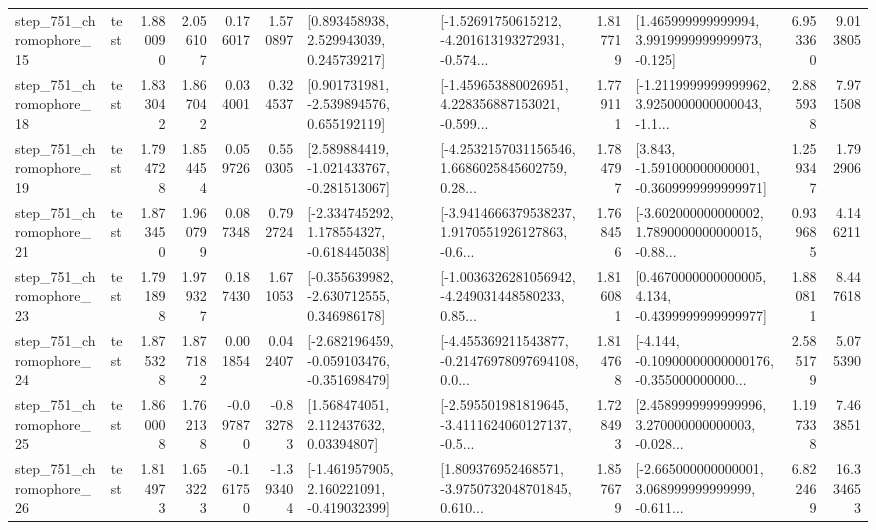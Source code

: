 \begin{tabular}{llrrrrllrlrr}
  step\_751\_chromophore\_15 &      test &      1.880090 &    2.056107 &      0.176017 &  1.570897 &     [0.893458938, 2.529943039, 0.245739217] &  [-1.52691750615212, -4.201613193272931, -0.574... &       1.817719 &    [1.465999999999994, 3.9919999999999973, -0.125] &            6.953360 &          9.013805 \\
  step\_751\_chromophore\_18 &      test &      1.833042 &    1.867042 &      0.034001 &  0.324537 &    [0.901731981, -2.539894576, 0.655192119] &  [-1.459653880026951, 4.228356887153021, -0.599... &       1.779111 &  [-1.2119999999999962, 3.9250000000000043, -1.1... &            2.885938 &          7.971508 \\
  step\_751\_chromophore\_19 &      test &      1.794728 &    1.854454 &      0.059726 &  0.550305 &   [2.589884419, -1.021433767, -0.281513067] &  [-4.2532157031156546, 1.6686025845602759, 0.28... &       1.784797 &   [3.843, -1.591000000000001, -0.3609999999999971] &            1.259347 &          1.792906 \\
  step\_751\_chromophore\_21 &      test &      1.873450 &    1.960799 &      0.087348 &  0.792724 &   [-2.334745292, 1.178554327, -0.618445038] &  [-3.9414666379538237, 1.9170551926127863, -0.6... &       1.768456 &  [-3.602000000000002, 1.7890000000000015, -0.88... &            0.939685 &          4.146211 \\
  step\_751\_chromophore\_23 &      test &      1.791898 &    1.979327 &      0.187430 &  1.671053 &   [-0.355639982, -2.630712555, 0.346986178] &  [-1.0036326281056942, -4.249031448580233, 0.85... &       1.816081 &   [0.4670000000000005, 4.134, -0.4399999999999977] &            1.880811 &          8.447618 \\
  step\_751\_chromophore\_24 &      test &      1.875328 &    1.877182 &      0.001854 &  0.042407 &  [-2.682196459, -0.059103476, -0.351698479] &  [-4.455369211543877, -0.21476978097694108, 0.0... &       1.814768 &  [-4.144, -0.10900000000000176, -0.355000000000... &            2.585179 &          5.075390 \\
  step\_751\_chromophore\_25 &      test &      1.860008 &    1.762138 &     -0.097870 & -0.832783 &      [1.568474051, 2.112437632, 0.03394807] &  [-2.595501981819645, -3.4111624060127137, -0.5... &       1.728493 &  [2.4589999999999996, 3.270000000000003, -0.028... &            1.197338 &          7.463851 \\
  step\_751\_chromophore\_26 &      test &      1.814973 &    1.653223 &     -0.161750 & -1.393404 &   [-1.461957905, 2.160221091, -0.419032399] &  [1.809376952468571, -3.9750732048701845, 0.610... &       1.857679 &  [-2.665000000000001, 3.068999999999999, -0.611... &            6.822469 &         16.334653 \\

\end{tabular}
